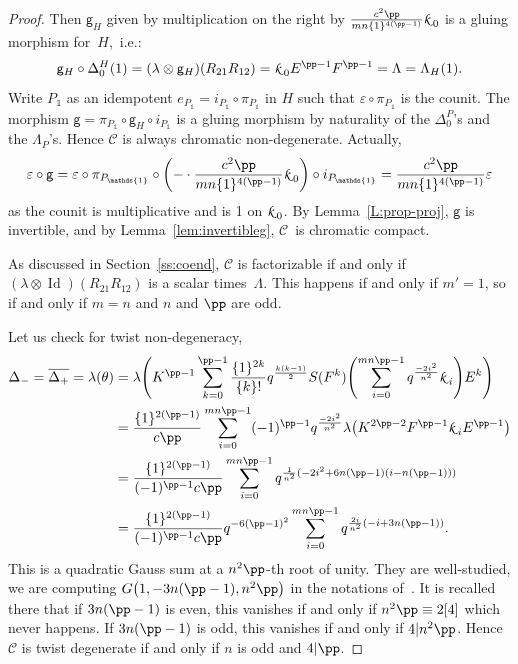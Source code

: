 \documentclass[pdftex]{sigma}
\numberwithin{equation}{section}
\newcommand{\smk}{{\fontfamily{pzc}\selectfont \text{k}}}
\newcommand{\gm}{{\mathsf{g}}}
\numberwithin{theorem}{section}
\numberwithin{proposition}{section}
\numberwithin{definition}{section}
\numberwithin{lemma}{section}
\numberwithin{corollary}{section}
\numberwithin{remark}{section}
\numberwithin{example}{section}
\newcommand{\cat}{\mathcal{C}}
\newcommand{\unit}{\ensuremath{\mathds{1}}}
\newcommand{\Id}{\operatorname{Id}}
\begin{document}
\begin{proof}
 Then $\gm_H$ given by multiplication on the right by $\frac{c^2{\pp}}{mn\{1\}^{4({\pp}-1)}}\smk_{\;0}$ is a gluing morphism for~$H$,~i.e.:
\[
\gm_H \circ \Delta_0^H(1) = (\lambda \otimes \gm_H)(R_{21}R_{12})= \smk_{\;0}E^{{\pp}-1}F^{{\pp}-1}=\Lambda=\Lambda_H(1).
\]
Write $P_\unit$ as an idempotent
$e_{P_\unit}=i_{P_\unit} \circ \pi_{P_\unit}$ in $H$ such that
$\varepsilon \circ \pi_{P_\unit}$ is the counit. The morphism
$\gm = \pi_{P_\unit} \circ \gm_H \circ i_{P_\unit}$ is a gluing
morphism by naturality of the $\Delta_0^P$'s and the $\Lambda_P$'s.
Hence $\cat$ is always chromatic non-degenerate. Actually,
\[
\varepsilon\circ\gm=\varepsilon\circ\pi_{P_\unit}\circ\left(-\cdot \frac{c^2{\pp}}{mn\{1\}^{4({\pp}-1)}}\smk_{\;0}\right)\circ i_{P_\unit}=\frac{c^2{\pp}}{mn\{1\}^{4({\pp}-1)}}\varepsilon
\]
as the counit is multiplicative and is 1 on $\smk_{\;0}$.
By Lemma~\ref{L:prop-proj}, $\gm$ is invertible,
and by Lemma~\ref{lem:invertibleg}, $\cat$~is chromatic compact.

As discussed in Section~\ref{ss:coend}, $\cat$ is factorizable if and only if $(\lambda \otimes \Id)(R_{21}R_{12})$ is a scalar times~$\Lambda$. This happens if and only if $m'=1$, so if and only if $m=n$ and $n$ and ${\pp}$ are odd.

Let us check for twist non-degeneracy,
\begin{align*}
\Delta_-=\overline{\Delta_+}=\lambda(\theta) &{}= \lambda\Biggl(K^{{\pp}-1}\sum_{k=0}^{{\pp}-1} \frac{\{1\}^{2k}}{\{k\}!}q^\frac{k(k-1)}{2} S(F^k)\Biggl(\sum_{i=0}^{mn{\pp}-1} q^{\frac{-2i^2}{n^2}}\smk_{\; i}\Biggr) E^k\Biggr)\\
&{}= \frac{\{1\}^{2({\pp}-1)}}{c{\pp}}\sum\limits_{i=0}^{mn{\pp}-1}(-1)^{{\pp}-1}q^{\frac{-2i^2}{n^2}} \lambda\bigl(K^{2{\pp}-2}F^{{\pp}-1}\smk_{\; i}E^{{\pp}-1}\bigr)\\
&{}= \frac{\{1\}^{2({\pp}-1)}}{(-1)^{{\pp}-1}c{\pp}}\sum\limits_{i=0}^{mn{\pp}-1}q^{\frac{1}{n^2} (-2i^2+6n({\pp}-1)(i-n({\pp}-1)) )}\\
&{}= \frac{\{1\}^{2({\pp}-1)}}{(-1)^{{\pp}-1}c{\pp}}q^{-6({\pp}-1)^2}\sum\limits_{i=0}^{mn{\pp}-1}q^{\frac{2i}{n^2} (-i+3n({\pp}-1) )}.
\end{align*}
This is a quadratic Gauss sum at a $n^2{\pp}$-th root of unity. They are well-studied, we are computing $G\bigl(1,-3n(\pp-1),n^2\pp\bigr)$ in the notations of~\cite[Appendix B]{BD21}. It is recalled there that if $3n({\pp}-1)$ is even, this vanishes if and only if $n^2{\pp} \equiv 2[4]$ which never happens. If $3n({\pp}-1)$ is odd, this vanishes if and only if $4\vert n^2{\pp}$. Hence $\cat$ is twist degenerate if and only if $n$ is odd and $4\vert {\pp}$.
\end{proof}
\end{document}
